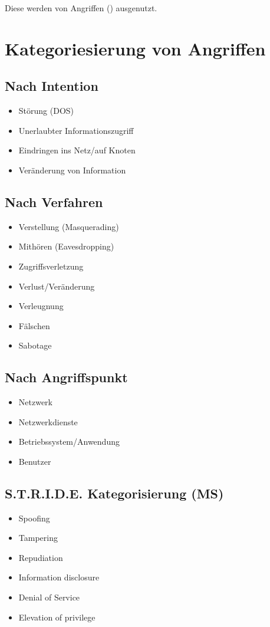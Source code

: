 \vspace{0.3cm}

Diese werden von Angriffen () ausgenutzt.

\section{Kategoriesierung von Angriffen}
\subsection{Nach Intention}
\begin{itemize}
    \item Störung (DOS)
    \item Unerlaubter Informationszugriff
    \item Eindringen ins Netz/auf Knoten
    \item Veränderung von Information
\end{itemize}

\subsection{Nach Verfahren}
\begin{itemize}
    \item Verstellung (Masquerading) 
    \item Mithören (Eavesdropping)
    \item Zugriffsverletzung
    \item Verlust/Veränderung
    \item Verleugnung
    \item Fälschen
    \item Sabotage
\end{itemize}

\subsection{Nach Angriffspunkt}
\begin{itemize}
    \item Netzwerk
    \item Netzwerkdienste
    \item Betriebssystem/Anwendung
    \item Benutzer
\end{itemize}

\subsection{S.T.R.I.D.E. Kategorisierung (MS)}
\begin{itemize}
    \item Spoofing
    \item Tampering
    \item Repudiation
    \item Information disclosure
    \item Denial of Service
    \item Elevation of privilege
\end{itemize}


